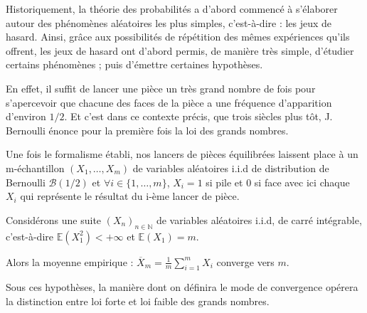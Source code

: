 \documentclass{article}
\begin{document}
\begin{center}
\end{center}

\vspace{0.1cm}

\begin{justify}
Historiquement, la théorie des probabilités a d'abord commencé à s'élaborer autour des phénomènes aléatoires les plus simples, c'est-à-dire : les jeux de hasard. 
Ainsi, grâce aux possibilités de répétition des mêmes expériences qu'ils offrent, les jeux de hasard ont d'abord permis, de manière très simple, d'étudier certains phénomènes ; puis d'émettre certaines hypothèses.
\end{justify}


\begin{justify}
\noindent En effet, il suffit de lancer une pièce un très grand nombre de fois pour s'apercevoir que chacune des faces de la pièce a une fréquence d'apparition d'environ $1/2$. Et c'est dans ce contexte précis, que trois siècles plus tôt, J. Bernoulli énonce pour la première fois la loi des grands nombres.
\end{justify}



\begin{justify}
\noindent Une fois le formalisme établi, nos lancers de pièces équilibrées laissent place à un m-échantillon $(X_1, \dots, X_m)$ de variables aléatoires i.i.d de distribution de Bernoulli $\mathcal{B}(1/2)$ et $\forall i \in \{1, \dots, m\}$, $X_i = 1$ si pile et $0$ si face avec ici chaque $X_i$ qui représente le résultat du i-ème lancer de pièce.
\end{justify}



\begin{justify}
\noindent
Considérons une suite $(X_n)_{n \in \mathbb{N}}$ de variables aléatoires i.i.d, de carré intégrable, c'est-à-dire $\mathbb{E}(X_1^2) < +\infty$ et $\mathbb{E}(X_1) = m$.

\noindent Alors la moyenne empirique : $\overline{X}_m = \frac{1}{m} \sum_{i=1}^{m} X_i$ converge vers $m$.

\noindent Sous ces hypothèses, la manière dont on définira le mode de convergence opérera la distinction entre loi forte et loi faible des grands nombres.
\end{justify}
\end{document}

